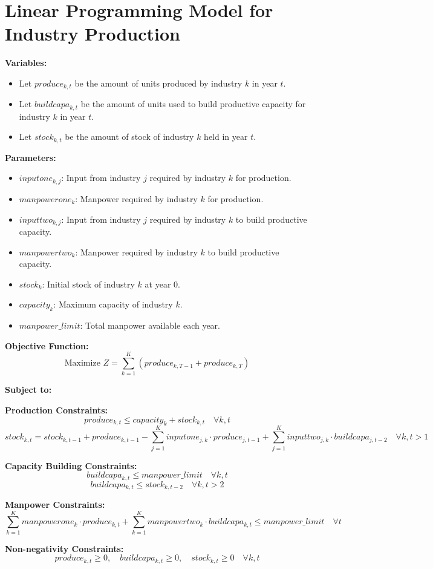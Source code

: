 \documentclass{article}
\begin{document}
\section*{Linear Programming Model for Industry Production}

\textbf{Variables:}
\begin{itemize}
    \item Let \( produce_{k, t} \) be the amount of units produced by industry \( k \) in year \( t \).
    \item Let \( buildcapa_{k, t} \) be the amount of units used to build productive capacity for industry \( k \) in year \( t \).
    \item Let \( stock_{k, t} \) be the amount of stock of industry \( k \) held in year \( t \).
\end{itemize}

\textbf{Parameters:}
\begin{itemize}
    \item \( inputone_{k, j} \): Input from industry \( j \) required by industry \( k \) for production.
    \item \( manpowerone_{k} \): Manpower required by industry \( k \) for production.
    \item \( inputtwo_{k, j} \): Input from industry \( j \) required by industry \( k \) to build productive capacity.
    \item \( manpowertwo_{k} \): Manpower required by industry \( k \) to build productive capacity.
    \item \( stock_{k} \): Initial stock of industry \( k \) at year 0.
    \item \( capacity_{k} \): Maximum capacity of industry \( k \).
    \item \( manpower\_limit \): Total manpower available each year.
\end{itemize}

\textbf{Objective Function:}
\[
\text{Maximize } Z = \sum_{k=1}^{K} (produce_{k, T-1} + produce_{k, T})
\]

\textbf{Subject to:}

\textbf{Production Constraints:}
\[
produce_{k, t} \leq capacity_{k} + stock_{k, t} \quad \forall k, t
\]
\[
stock_{k, t} = stock_{k, t-1} + produce_{k, t-1} - \sum_{j=1}^{K} inputone_{j, k} \cdot produce_{j, t-1} + \sum_{j=1}^{K} inputtwo_{j, k} \cdot buildcapa_{j, t-2} \quad \forall k, t > 1
\]

\textbf{Capacity Building Constraints:}
\[
buildcapa_{k, t} \leq manpower\_limit \quad \forall k, t
\]
\[
buildcapa_{k, t} \leq stock_{k, t-2} \quad \forall k, t > 2
\]

\textbf{Manpower Constraints:}
\[
\sum_{k=1}^{K} manpowerone_{k} \cdot produce_{k, t} + \sum_{k=1}^{K} manpowertwo_{k} \cdot buildcapa_{k, t} \leq manpower\_limit \quad \forall t
\]

\textbf{Non-negativity Constraints:}
\[
produce_{k, t} \geq 0, \quad buildcapa_{k, t} \geq 0, \quad stock_{k, t} \geq 0 \quad \forall k, t
\]
\end{document}

